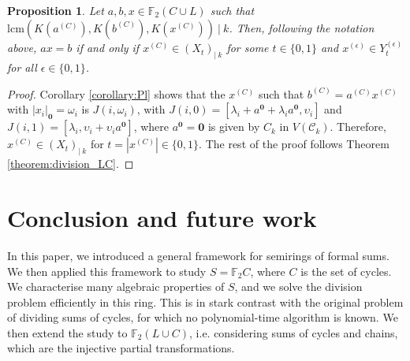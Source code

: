 \documentclass[a4paper, 11pt]{article}
\theoremstyle{plain}
\newtheorem{proposition}[theorem]{Proposition}
\theoremstyle{definition}
\newcommand{\F} {\mathbb{F}}
\newcommand{\zero}      {\mathbf{0}}
\newcommand{\lcm}       {\mathrm{lcm}}
\begin{document}
\begin{proposition}
Let $a,b,x \in \F_2(C \cup L)$ such that $\lcm( K(a^{(C)}), K(b^{(C)}) , K( x^{(C)} )) \ | \ k$. Then, following the notation above, $ax = b$ if and only if $x^{(C)} \in (X_t)_{| \ k}$ for some $t \in \{0,1\}$ and $x^{(\epsilon)} \in  Y_t^{(\epsilon)}$ for all $\epsilon \in \{0,1\}$.
\end{proposition}

\begin{proof}
Corollary \ref{corollary:Pl} shows that the $x^{(C)}$ such that $b^{(C)} = a^{(C)} x^{(C)}$ with $|x_i|_\zero = \omega_i$ is $J(i, \omega_i)$, with $J(i,0) =[\lambda_i + a^\zero + \lambda_i a^\zero, \upsilon_i]$ and $J(i,1) = [ \lambda_i, \upsilon_i + \upsilon_i a^\zero ]$, where $a^\zero = \zero$ is given by $C_k$ in $V( \mathcal{C}_k )$. Therefore, $x^{(C)} \in (X_t)_{| \ k}$ for $t = |x^{(C)}| \in \{0,1\}$. The rest of the proof follows Theorem \ref{theorem:division_LC}.
\end{proof}


\section{Conclusion and future work} \label{section:conclusion}

In this paper, we introduced a general framework for semirings of formal sums. We then applied this framework to study $S = \F_2 C$, where $C$ is the set of cycles. We characterise many algebraic properties of $S$, and we solve the division problem efficiently in this ring. This is in stark contrast with the original problem of dividing sums of cycles, for which no polynomial-time algorithm is known. We then extend the study to $\F_2 (L \cup C)$, i.e. considering sums of cycles and chains, which are the injective partial transformations.
\end{document}
